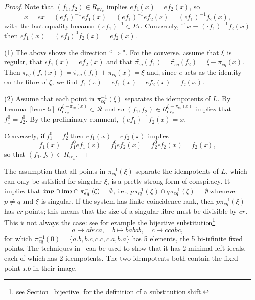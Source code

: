 \documentclass[12pt]{amsart}
\theoremstyle{definition}
\numberwithin{equation}{section}
\newcommand{\Rr}{{\mathcal R}}
\newcommand{\pe}{\pi_{eq}}
\newcommand{\fb}[1]{\pe^{-1}(#1)}
\newcommand{\tpe}{\widetilde{\pe}}
\newcommand{\im}{\mbox{\rm im}}
\newcommand{\ev}{\mathrm{ev}}
\begin{document}
\begin{proof} 
Note that $(f_1,f_2)\in R_{\ev_{x}}$ implies $ef_1(x) = e f_2(x)$, so
\[x=ex  =(ef_1)^{-1}ef_1(x) = (ef_1)^{-1}e f_2(x) = (ef_1)^{-1} f_2(x), \]
 with the last equality because $(ef_1)^{-1}\in Ee$. Conversely,
 if $x = (ef_1)^{-1} f_2(x)$ then $ef_1(x) = (ef_1)^0 f_2(x) = ef_2(x)$.
 
(1) The above shows the direction ``$\Rightarrow$". For the converse, assume that $\xi$ is regular, that  $ef_1(x)  = ef_2(x)$ and  that $
   \tpe(f_1) = \tpe(f_2) = \xi-\pe(x)$. Then $\pe(f_i(x)) =  \tpe(f_i)      +\pe(x) = \xi$ and, since $e$ acts as the identity on the fibre of $\xi$, we find  $f_1(x) =ef_1(x) = e f_2(x)=f_2(x)$.

(2) Assume that each point in  $\fb{\xi}$ separates the idempotents of $L$. By Lemma~\ref{lem-Rr} 
$R^{\xi-\pe(x)}_{\ev_{x}}\subset \Rr$ and so $(f_1,f_2)\in R^{\xi-\pe(x)}_{\ev_{x}}$ implies that   $f_1^0=f_2^0$. By the preliminary comment, $(ef_1)^{-1}f_2(x) = x$.

Conversely, if $f_1^0=f_2^0$ then 
$ef_1(x) = e f_2(x)$ implies \[f_1(x) = f_1^0  e f_1(x) = f_1^0 e f_2(x)= f_2^0 e f_2(x)=f_2(x),\]
so that $(f_1,f_2)\in R_{\ev_{x}}$.
\end{proof}
The assumption that all points in  $\fb{\xi}$ separate the idempotents of $L$, which can only be satisfied for singular $\xi$, is a pretty strong form of conspiracy. It implies that 
$\im p \cap \im q \cap \fb{\xi} =\emptyset$, i.e., $p \fb{\xi}\cap q \fb{\xi}=\emptyset$
whenever $p\neq q$ and $\xi$ is singular. If the system has finite coincidence rank, then 
$ p \fb{\xi}$ has $cr$ points; this means that the size of a singular fibre must be divisible by $cr$. This is not always the case: see for example the  bijective substitution\footnote{see Section~\ref{bijective} for the definition of a substitution shift.}
\[ a \mapsto abcca,\quad b\mapsto babab,\quad c\mapsto ccabc,\]
 for which $\pe^{-1}(0)=\{a.b,b.c,c.c,c.a,b.a\}$ has 5 elements, the 5 bi-infinite fixed points. The techniques in~\cite{ESBS} can be used to show that it has 2 minimal left ideals, each of which has 2 idempotents. The two idempotents both contain the fixed point $a.b$ in their image. 
\end{document}
